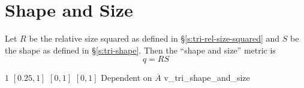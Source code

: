 \section{Shape and Size\label{s:tri-shape-and-size}}

Let $R$ be the relative size squared as defined in \S\ref{s:tri-rel-size-squared}
and $S$ be the shape as defined in \S\ref{s:tri-shape}.
Then the ``shape and size'' metric is 
\[
  q = RS
\]

%
{$1$}%
{$[0.25,1]$}%
{$[0,1]$}%
{$[0,1]$}%
{Dependent on $\overline{A}$}%
{\cite{knu:03}}%
{v\_tri\_shape\_and\_size}%

